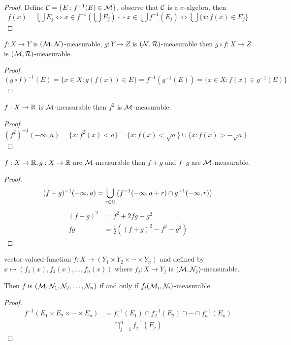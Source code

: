 \begin{proof}
  Define $\mathcal C = \{E : f^{-1}(E) \in \mathcal M\}$, observe that $\mathcal C$ is a $\sigma$-algebra. then
  \[f(x) = \bigcup E_j \iff x \in f^{-1}\left(\bigcup E_j\right) \iff x \in \bigcup f^{-1}(E_j) \iff \bigcup\{x  : f(x) \in E_j\}\]
\end{proof}

\begin{claim}
$f: X \to Y$ is $(\mathcal M, \mathcal N)$-measurable, $g: Y \to Z$ is $(\mathcal N, \mathcal R)$-measurable then $g \circ f: X \to Z$ is $(\mathcal M, \mathcal R)$-measurable.
\end{claim}
\begin{proof}
  $(g \circ f)^{-1}(E) = \{x \in X : g(f(x)) \in E\} = f^{-1}(g^{-1}(E)) = \{x \in X: f(x) \in g^{-1}(E)\}$
\end{proof}

\begin{claim}
  $f: X \to \mathbb R$ is $\mathcal M$-measurable then $f^2$ is $\mathcal M$-measurable.
\end{claim}

\begin{proof}
  $(f^2)^{-1}(-\infty, a) = \{x : f^2(x) < a\} = \{x : f(x) < \sqrt{a}\} \cup \{x : f(x) > -\sqrt{a}\}$
\end{proof}

\begin{claim}
  $f: X \to \mathbb R, g: X \to \mathbb R$ are $\mathcal M$-measurable then $f + g$ and $f \cdot g$ are $\mathcal M$-measurable.
\end{claim}

\begin{proof}
  \[(f+g)^{-1}(-\infty, a) = \bigcup_{r \in \mathbb Q} \left(f^{-1}(-\infty, a + r) \cap g^{-1}(-\infty, r)\right)\]
  \begin{align*}
    (f+g)^2 &= f^2 + 2fg + g^2 \\
    fg &= \frac12\left((f+g)^2 - f^2 - g^2\right)
  \end{align*}
\end{proof}


\begin{claim}
  
vector-valued-function
$f: X \to (Y_1 \times Y_2 \times \dotsm \times Y_n)$ and defined by 
$x \mapsto (f_1(x), f_2(x), \dotsc, f_n(x))$ where $f_j: X \to Y_j$ is $(\mathcal M, \mathcal N_j)$-measurable.

Then $f$ is $(\mathcal M, \mathcal N_1, \mathcal N_2, \dotsc,\mathcal N_n)$ if and only if $f_i(\mathcal M_i, \mathcal N_i)$-measurable.
\end{claim}
\begin{proof}
  
\begin{align*}
  f^{-1}(E_1 \times E_2 \times \dotsm \times E_n) &= f_1^{-1}(E_1) \cap f_2^{-1}(E_2) \cap \dotsm \cap f_n^{-1}(E_n) \\
  &= \bigcap_{j=1}^n f_j^{-1}(E_j)
\end{align*}
\end{proof}

